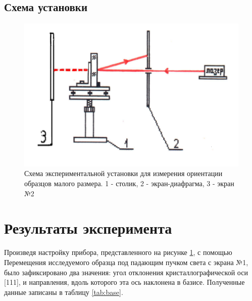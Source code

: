 \subsection{Схема установки}\label{subsec:schemes}
\begin{figure}[H]
        \centering
        \includegraphics[width=0.7\columnwidth]{figures/Scheme}%
        \caption{Схема экспериментальной установки для измерения ориентации образцов малого размера. 1 - столик, 2 - экран-диафрагма, 3 - экран №2}
		\label{fig:Scheme}
\end{figure}

\section{Результаты эксперимента}\label{sec:results}

Произведя настройку прибора, представленного на рисунке \ref{fig:Scheme},
с помощью Перемещения исследуемого образца под падающим пучком света с экрана №1, было зафиксировано два значения:
угол отклонения  кристаллографической оси [111], и направления, вдоль которого эта ось наклонена в базисе.
Полученные данные записаны в таблицу \ref{tab:base}.

